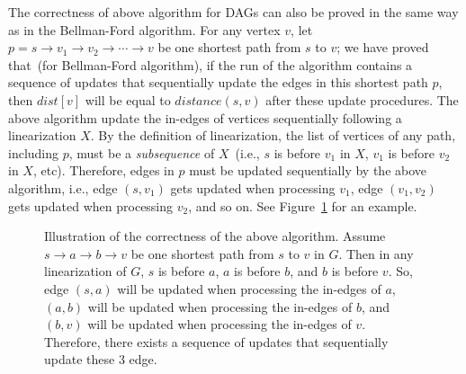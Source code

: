 
\begin{minipage}{0.8\textwidth}
	\xxx
	\xxx
	\xxx
	\xxx
	\xxx
	\xxx
	\xxx
	\xxx
	\xxx
	\xxx
\end{minipage}


The correctness of above algorithm for DAGs can also be proved in the same way as in the Bellman-Ford algorithm.
For any vertex $v$, let $p = s \to v_1 \to v_2 \to \cdots \to v$ be one shortest path from $s$ to $v$;
we have proved that~(for Bellman-Ford algorithm), if the run of the algorithm contains a {sequence} of updates 
that sequentially update the edges in this shortest path $p$, then 
$dist[v]$ will be equal to $distance(s,v)$ after these update procedures.
The above algorithm update the in-edges of vertices sequentially following a linearization $X$.
By the definition of linearization, the list of vertices of any path, including $p$, must be a \emph{subsequence} of $X$~(i.e., $s$ is before
$v_1$ in $X$, $v_1$ is before $v_2$ in $X$, etc).
Therefore, edges in $p$ must be updated
sequentially by the above algorithm, i.e., edge $(s, v_1)$ gets updated when processing $v_1$,
edge $(v_1, v_2)$ gets updated when processing $v_2$, and so on. 
See Figure~\ref{fig:dag} for an example.

\begin{figure}[h]
\centering{}
\caption{Illustration of the correctness of the above algorithm.
Assume $s\to a \to b \to v$ be one shortest path from $s$ to $v$ in $G$.
Then in any linearization of $G$, $s$ is before $a$, $a$ is before $b$, and $b$ is before $v$.
So, edge $(s, a)$ will be updated when processing the in-edges of $a$, 
$(a, b)$ will be updated when processing the in-edges of $b$, 
and $(b, v)$ will be updated when processing the in-edges of $v$.
Therefore, there exists a sequence of updates that sequentially update these 3 edge.  }
\label{fig:dag}
\end{figure}
